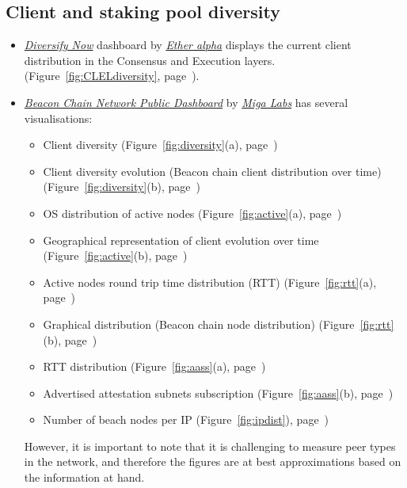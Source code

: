 \documentclass[UTF8]{article}
\begin{document}
\subsection{Client and staking pool diversity}
\label{sec:diversity}
\begin{itemize}
	\item \textit{\href{https://clientdiversity.org/}{Diversify Now}} dashboard by \textit{\href{https://etheralpha.org/}{Ether alpha}} displays the current client distribution in the Consensus and Execution layers. (Figure~\ref{fig:CLELdiversity}, page~\pageref{fig:CLELdiversity}).
	\item \textit{\href{https://migalabs.es/beaconnodes}{Beacon Chain Network Public Dashboard}} by \textit{\href{https://migalabs.es/}{Miga Labs}} has several visualisations: 
	\begin{itemize}
		\item Client diversity  (Figure~\ref{fig:diversity}(a), page~\pageref{fig:diversity})
		\item Client diversity evolution (Beacon chain client distribution over time) (Figure~\ref{fig:diversity}(b), page~\pageref{fig:diversity})
		\item OS distribution of active nodes (Figure~\ref{fig:active}(a), page~\pageref{fig:active})
		\item Geographical representation of client evolution over time  (Figure~\ref{fig:active}(b), page~\pageref{fig:active})
		\item Active nodes round trip time distribution (RTT) (Figure~\ref{fig:rtt}(a), page~\pageref{fig:rtt})
		\item Graphical distribution (Beacon chain node distribution)  (Figure~\ref{fig:rtt}(b), page~\pageref{fig:rtt})
		\item RTT distribution (Figure~\ref{fig:aass}(a), page~\pageref{fig:aass})
		\item Advertised attestation subnets subscription (Figure~\ref{fig:aass}(b), page~\pageref{fig:aass})
		\item Number of beach nodes per IP (Figure~\ref{fig:ipdist}), page~\pageref{fig:ipdist})
	\end{itemize}
However, it is important to note that it is challenging to measure peer types in the network, and therefore the figures are at best approximations based on the information at hand. 

\end{itemize}	
\end{document}
